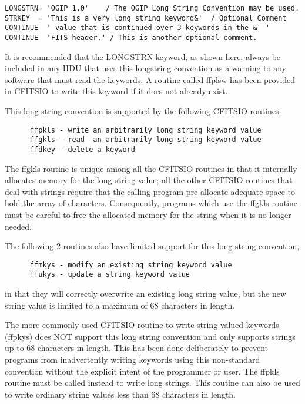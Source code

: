 \begin{verbatim}
LONGSTRN= 'OGIP 1.0'    / The OGIP Long String Convention may be used.
STRKEY  = 'This is a very long string keyword&'  / Optional Comment
CONTINUE  ' value that is continued over 3 keywords in the &  '
CONTINUE  'FITS header.' / This is another optional comment.
\end{verbatim}
It is recommended that the LONGSTRN keyword, as shown here, always be
included in any HDU that uses this longstring convention as a warning
to any software that must read the keywords.  A routine called ffplsw
has been provided in CFITSIO to write this keyword if it does not
already exist.

This long string convention is supported by the following CFITSIO
routines:

\begin{verbatim}
      ffpkls - write an arbitrarily long string keyword value
      ffgkls - read  an arbitrarily long string keyword value
      ffdkey - delete a keyword
\end{verbatim}
The ffgkls routine is unique among all the CFITSIO routines in that it
internally allocates memory for the long string value;  all the other
CFITSIO routines that deal with strings require that the calling
program pre-allocate adequate space to hold the array of characters.
Consequently, programs which use the ffgkls routine must be careful to
free the allocated memory for the string when it is no longer needed.

The following 2 routines also have limited support for this
long string convention,

\begin{verbatim}
      ffmkys - modify an existing string keyword value
      ffukys - update a string keyword value
\end{verbatim}
in that they will correctly overwrite an existing long string value,
but the new string value is limited to a maximum of 68 characters in
length.

The more commonly used CFITSIO routine to write string valued
keywords (ffpkys) does NOT support this long string convention and only
supports strings up to 68 characters in length.  This has been done
deliberately to prevent programs from inadvertently writing keywords
using this non-standard convention without the explicit intent of the
programmer or user.   The ffpkls routine must be called instead to
write long strings.  This routine can also be used to write ordinary
string values less than 68 characters in length.


